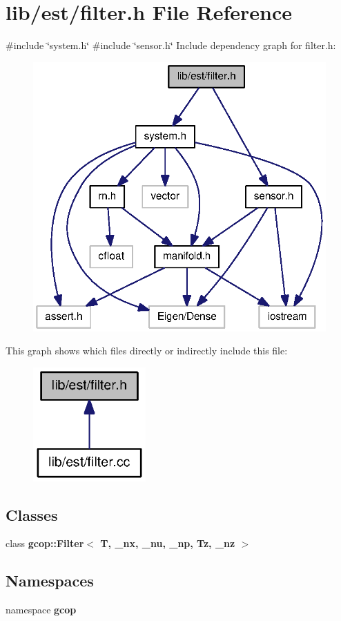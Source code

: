 \section{lib/est/filter.h \-File \-Reference}
\label{filter_8h}
{\ttfamily \#include \char`\"{}system.\-h\char`\"{}}\*
{\ttfamily \#include \char`\"{}sensor.\-h\char`\"{}}\*
\-Include dependency graph for filter.\-h\-:\nopagebreak
\begin{figure}[H]
\begin{center}
\leavevmode
\includegraphics[width=320pt]{filter_8h__incl}
\end{center}
\end{figure}
\-This graph shows which files directly or indirectly include this file\-:\nopagebreak
\begin{figure}[H]
\begin{center}
\leavevmode
\includegraphics[width=122pt]{filter_8h__dep__incl}
\end{center}
\end{figure}
\subsection*{\-Classes}
\begin{DoxyCompactItemize}
\item 
class {\bf gcop\-::\-Filter$<$ T, \-\_\-nx, \-\_\-nu, \-\_\-np, Tz, \-\_\-nz $>$}
\end{DoxyCompactItemize}
\subsection*{\-Namespaces}
\begin{DoxyCompactItemize}
\item 
namespace {\bf gcop}
\end{DoxyCompactItemize}
